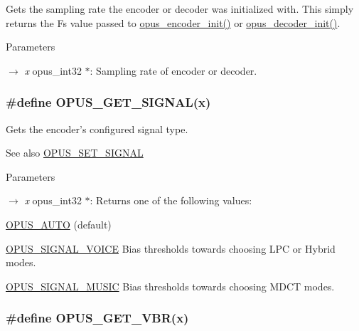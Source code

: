 Gets the sampling rate the encoder or decoder was initialized with. This simply returns the {\ttfamily Fs} value passed to \hyperlink{group__opus__encoder_ga515db1c267a7421dacaad3610f79eb79}{opus\_\-encoder\_\-init()} or \hyperlink{group__opus__decoder_ga939156d1f561c4273d5c62fa9c235a01}{opus\_\-decoder\_\-init()}. 
\begin{DoxyParams}{Parameters}
\item[\mbox{$\rightarrow$} {\em x}]{\ttfamily opus\_\-int32 $\ast$}: Sampling rate of encoder or decoder. \end{DoxyParams}
\hypertarget{group__opus__encoderctls_ga640d434de535e2d2caec991c347303a4}{
\subsubsection[{OPUS\_\-GET\_\-SIGNAL}]{\setlength{\rightskip}{0pt plus 5cm}\#define OPUS\_\-GET\_\-SIGNAL(x)}}
\label{group__opus__encoderctls_ga640d434de535e2d2caec991c347303a4}


Gets the encoder's configured signal type. \begin{DoxySeeAlso}{See also}
\hyperlink{group__opus__encoderctls_gaaa87ccee4ae46aa6c9528e03c5122b89}{OPUS\_\-SET\_\-SIGNAL} 
\end{DoxySeeAlso}

\begin{DoxyParams}{Parameters}
\item[\mbox{$\rightarrow$} {\em x}]{\ttfamily opus\_\-int32 $\ast$}: Returns one of the following values: 
\begin{DoxyDescription}
\item[\hyperlink{group__opus__ctlvalues_ga1c5b3244b018ff4548d2d6bffa418472}{OPUS\_\-AUTO} ](default) 
\item[\hyperlink{group__opus__ctlvalues_ga085a116fed816373d3b9eae28df49404}{OPUS\_\-SIGNAL\_\-VOICE}]Bias thresholds towards choosing LPC or Hybrid modes. 
\item[\hyperlink{group__opus__ctlvalues_gaa0c228c664b6d426f4c213e3a5350889}{OPUS\_\-SIGNAL\_\-MUSIC}]Bias thresholds towards choosing MDCT modes. 
\end{DoxyDescription}\end{DoxyParams}
\hypertarget{group__opus__encoderctls_ga58feba30c167962305ec268e6abe8c08}{
\subsubsection[{OPUS\_\-GET\_\-VBR}]{\setlength{\rightskip}{0pt plus 5cm}\#define OPUS\_\-GET\_\-VBR(x)}}
\label{group__opus__encoderctls_ga58feba30c167962305ec268e6abe8c08}


